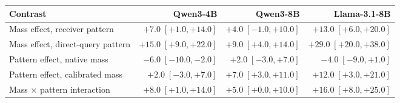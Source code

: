 \begingroup\renewcommand{\arraystretch}{1.08}
\begin{tabular}{lrrr}
\toprule
\textbf{Contrast} & \textbf{Qwen3-4B} & \textbf{Qwen3-8B} & \textbf{Llama-3.1-8B} \\
\midrule
Mass effect, receiver pattern & $+7.0\;[+1.0, +14.0]$ & $+4.0\;[-1.0, +10.0]$ & $+13.0\;[+6.0, +20.0]$ \\
Mass effect, direct-query pattern & $+15.0\;[+9.0, +22.0]$ & $+9.0\;[+4.0, +14.0]$ & $+29.0\;[+20.0, +38.0]$ \\
Pattern effect, native mass & $-6.0\;[-10.0, -2.0]$ & $+2.0\;[-3.0, +7.0]$ & $-4.0\;[-9.0, +1.0]$ \\
Pattern effect, calibrated mass & $+2.0\;[-3.0, +7.0]$ & $+7.0\;[+3.0, +11.0]$ & $+12.0\;[+3.0, +21.0]$ \\
\rowcolor{tableours}Mass $\times$ pattern interaction & $+8.0\;[+1.0, +14.0]$ & $+5.0\;[+0.0, +10.0]$ & $+16.0\;[+8.0, +25.0]$ \\
\bottomrule
\end{tabular}
\endgroup
